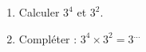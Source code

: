 
\begin{exercice}\label{exo2smath-0199}

    \begin{enumerate}
        \item
            Calculer \( 3^4\) et \( 3^2\).
        \item
            Compléter : \( 3^4\times 3^2=3^{\ldots}\)
    \end{enumerate}

\end{exercice}
